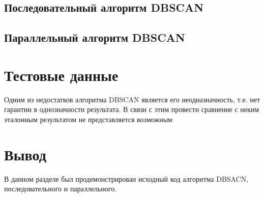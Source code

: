 \subsection{Последовательный алгоритм DBSCAN}

\newpage

\newpage

\subsection{Параллельный алгоритм DBSCAN}


\newpage

\newpage

\newpage

\newpage

\newpage
\section{Тестовые данные}

Одним из недостатков алгоритма DBSCAN является его неодназначность, т.е. нет гарантии в однозначности результата. В связи с этим провести сравнение с неким эталонным результатом не представляется возможным

\section*{Вывод}

В данном разделе был продемонстрирован исходный код алгоритма DBSACN, последовательного и параллельного.


